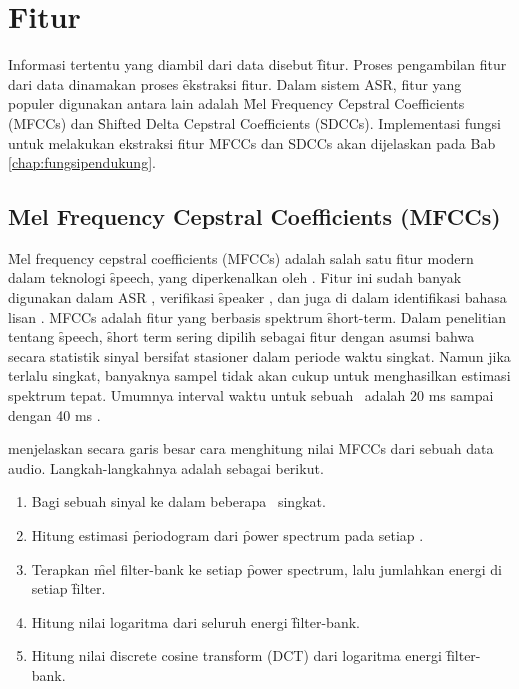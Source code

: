 \section{Fitur}
Informasi tertentu yang diambil dari data disebut \f{fitur}. Proses pengambilan fitur dari data dinamakan proses \f{ekstraksi fitur}. Dalam sistem ASR, fitur yang populer digunakan antara lain adalah \f{Mel Frequency Cepstral Coefficients} (MFCCs) dan \f{Shifted Delta Cepstral Coefficients} (SDCCs). Implementasi fungsi untuk melakukan ekstraksi fitur MFCCs dan SDCCs akan dijelaskan pada Bab \ref{chap:fungsipendukung}.

	\subsection{Mel Frequency Cepstral Coefficients (MFCCs)} \label{teorimfcc}
	\f{Mel frequency cepstral coefficients} (MFCCs) adalah salah satu fitur modern dalam teknologi \f{speech}, yang diperkenalkan oleh \cite{1163420}. Fitur ini sudah banyak digunakan dalam ASR \citep{young2002htk}, verifikasi \f{speaker} \citep{ganchev2005comparative}, dan juga di dalam identifikasi bahasa lisan \citep{yin2006combining}. MFCCs adalah fitur yang berbasis spektrum \f{short-term}. Dalam penelitian tentang \f{speech}, \f{short term} sering dipilih sebagai fitur dengan asumsi bahwa secara statistik sinyal bersifat stasioner dalam periode waktu singkat. Namun jika terlalu singkat, banyaknya sampel tidak akan cukup untuk menghasilkan estimasi spektrum tepat. Umumnya interval waktu untuk sebuah \fr~adalah 20 ms sampai dengan 40 ms \citep{zahra2013unique}.

  \cite{hitungmfcc} menjelaskan secara garis besar cara menghitung nilai MFCCs dari sebuah data audio. Langkah-langkahnya adalah sebagai berikut.
  \begin{enumerate}
    \item Bagi sebuah sinyal ke dalam beberapa \fr~singkat.
    \item Hitung estimasi \f{periodogram} dari \f{power spectrum} pada setiap \fr.
    \item Terapkan \f{mel filter-bank} ke setiap \f{power spectrum}, lalu jumlahkan energi di setiap \f{filter}.
    \item Hitung nilai logaritma dari seluruh energi \f{filter-bank}.
    \item Hitung nilai \f{discrete cosine transform} (DCT) dari logaritma energi \f{filter-bank}.
  \end{enumerate}



